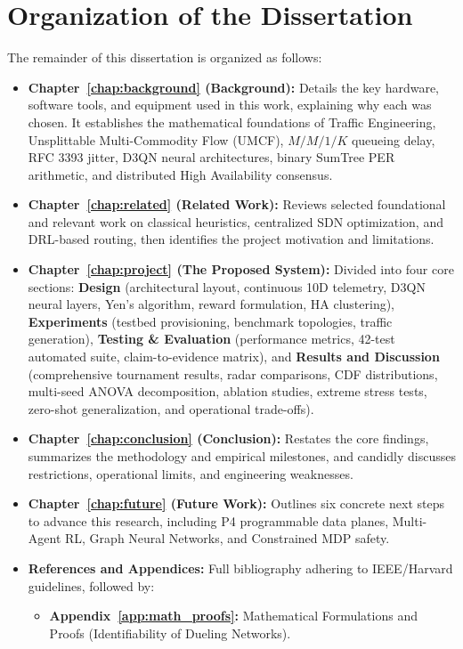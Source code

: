 \documentclass[12pt,a4paper,oneside]{report}
\begin{document}
\section{Organization of the Dissertation}
The remainder of this dissertation is organized as follows:
\begin{itemize}
    \item \textbf{Chapter~\ref{chap:background} (Background):} Details the key hardware, software tools, and equipment used in this work, explaining why each was chosen. It establishes the mathematical foundations of Traffic Engineering, Unsplittable Multi-Commodity Flow (UMCF), $M/M/1/K$ queueing delay, RFC 3393 jitter, D3QN neural architectures, binary SumTree PER arithmetic, and distributed High Availability consensus.
    \item \textbf{Chapter~\ref{chap:related} (Related Work):} Reviews selected foundational and relevant work on classical heuristics, centralized SDN optimization, and DRL-based routing, then identifies the project motivation and limitations.
    \item \textbf{Chapter~\ref{chap:project} (The Proposed System):} Divided into four core sections: \textbf{Design} (architectural layout, continuous 10D telemetry, D3QN neural layers, Yen's algorithm, reward formulation, HA clustering), \textbf{Experiments} (testbed provisioning, benchmark topologies, traffic generation), \textbf{Testing \& Evaluation} (performance metrics, 42-test automated suite, claim-to-evidence matrix), and \textbf{Results and Discussion} (comprehensive tournament results, radar comparisons, CDF distributions, multi-seed ANOVA decomposition, ablation studies, extreme stress tests, zero-shot generalization, and operational trade-offs).
    \item \textbf{Chapter~\ref{chap:conclusion} (Conclusion):} Restates the core findings, summarizes the methodology and empirical milestones, and candidly discusses restrictions, operational limits, and engineering weaknesses.
    \item \textbf{Chapter~\ref{chap:future} (Future Work):} Outlines six concrete next steps to advance this research, including P4 programmable data planes, Multi-Agent RL, Graph Neural Networks, and Constrained MDP safety.
    \item \textbf{References and Appendices:} Full bibliography adhering to IEEE/Harvard guidelines, followed by:
    \begin{itemize}
        \item \textbf{Appendix~\ref{app:math_proofs}:} Mathematical Formulations and Proofs (Identifiability of Dueling Networks).

\end{itemize}
\end{itemize}
\end{document}
